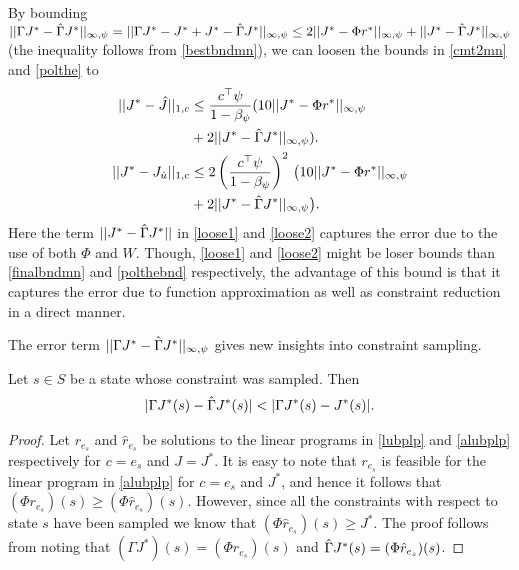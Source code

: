 \begin{note}
By bounding $||\Gamma J^*-\hat{\Gamma} J^*||_{\infty,\psi}=||\Gamma J^*-J^*+J^*-\hat{\Gamma} J^*||_{\infty,\psi}\leq 2||J^*-\Phi r^*||_{\infty,\psi}+||J^*-\hat{\Gamma} J^*||_{\infty,\psi}$ 
(the inequality follows from \cref{bestbndmn}), 
we can loosen the bounds in \cref{cmt2mn} and \cref{polthe} to
\begin{align}
\label{loose1}
||J^*-\hj||_{1,c}&\leq\frac{c^\top\psi}{1-\beta_\psi}(10 ||J^*-\Phi r^*||_{\mn}
\nn\\&
+2||J^*-\hg J^*||_{\mn}).\\
\label{loose2}
||J^* - J_{\hu}||_{1,c}&\leq 2\left(\frac{c^\top \psi}{1-\beta_{\psi}}\right)^2 \,\big(10 ||J^*-\Phi r^*||_{\mn}
\nn\\&
+2||J^*-\hg J^*||_{\mn}\big).
\end{align}
Here the term $||J^*-\hat{\Gamma} J^*||$ in \eqref{loose1} and \eqref{loose2} captures the error due to the use of both $\Phi$ and $W$. Though, \eqref{loose1} and \eqref{loose2} might be loser bounds than \eqref{finalbndmn} and \eqref{polthebnd} respectively, the advantage of this bound is that it captures the error due to function approximation as well as constraint reduction in a direct manner.
\end{note}
The error term $||\Gamma J^*-\hat{\Gamma} J^*||_{\infty,\psi}$ gives new insights into constraint sampling. 
\begin{theorem}\label{st}
Let $s\in S$ be a state whose constraint was sampled. Then
\begin{align}\label{sampexp}
|\Gamma J^*(s)-\hg J^*(s)|<|\Gamma J^*(s)-J^*(s)|.
\end{align}
\end{theorem}
\begin{proof}
Let $r_{e_s}$ and $\hat{r}_{e_s}$ be solutions to the linear programs in \eqref{lubplp} and \eqref{alubplp} respectively for $c=e_s$ and $J=J^*$. It is easy to note that $r_{e_s}$ is feasible for the linear program in \eqref{alubplp} for $c=e_s$ and $J^*$, and hence it follows that $(\Phi r_{e_s})(s)\geq (\Phi \hat{r}_{e_s})(s)$. However, since all the constraints with respect to state $s$ have been sampled we know that $(\Phi \hat{r}_{e_s})(s)\geq J^*$. The proof follows from noting that $(\Gamma J^*)(s)=(\Phi r_{e_s})(s)$ and $\hat{\Gamma} J^*(s)=(\Phi \hat{r}_{e_s})(s)$.
\end{proof}

